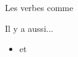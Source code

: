 \begin{frame}{Les verbes comme }
  \begin{center}
    
  \end{center}
  Il y a aussi...
  \begin{itemize}
    \item {} et 
  \end{itemize}
\end{frame}